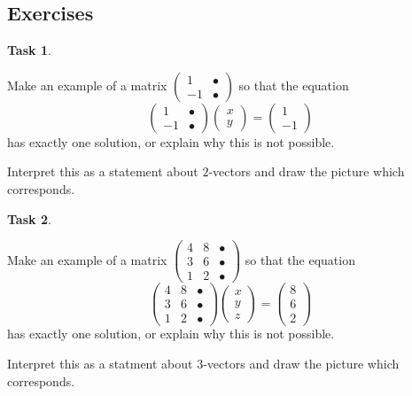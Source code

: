 \documentclass[10pt,]{book}
\theoremstyle{plain}
\theoremstyle{definition}
\numberwithin{equation}{section}
\newtheorem{task}{Task}[chapter]
\begin{document}
\subsection[Exercises]{Exercises}\label{subsection-14}
\begin{task}
\label{task-23}

          Make an example of a matrix \(\left(\begin{smallmatrix} 1 &
          \bullet \\ -1 & \bullet \end{smallmatrix}\right)\) so that the
          equation\[
          \begin{pmatrix} 1 & \bullet \\ -1 & \bullet \end{pmatrix}
          \begin{pmatrix} x \\ y \end{pmatrix} = \begin{pmatrix} 1 \\ -1
          \end{pmatrix}
          \]
          has exactly one solution, or explain why this is not possible.
\par

          Interpret this as a statement about \(2\)-vectors and draw the
          picture which corresponds.
\end{task}
\begin{task}
\label{task-24}

          Make an example of a matrix \(\left(\begin{smallmatrix} 4 &
          8 & \bullet \\ 3 & 6 & \bullet \\ 1 & 2 &
          \bullet \end{smallmatrix}\right)\) so that the equation\[
            \begin{pmatrix} 4 & 8 & \bullet \\ 3 & 6 & \bullet \\ 1 & 2 & \bullet \end{pmatrix} \begin{pmatrix} x \\ y \\ z \end{pmatrix} = \begin{pmatrix} 8 \\ 6 \\ 2 \end{pmatrix}
          \]
          has exactly one solution, or explain why this is not possible.
\par

          Interpret this as a statment about \(3\)-vectors and draw the
          picture which corresponds.
\end{task}
\end{document}
